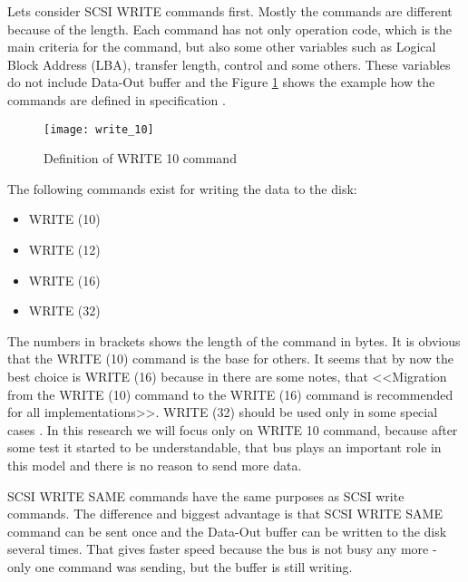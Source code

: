 Lets consider SCSI WRITE commands first. Mostly the commands are different because of the length. Each command has not only operation code, which is the main criteria for the command, but also some other variables such as Logical Block Address (LBA), transfer length, control and some others. These variables do not include Data-Out buffer and the Figure \ref{fig:write_10} shows the example how the commands are defined in specification \cite{scsi3_bc}.
\begin{figure}[h]
\begin{center}
  \texttt{[image: write\_10]}
\end{center}
  \caption{Definition of WRITE 10 command}
  \label{fig:write_10}
\end{figure}

The following commands exist for writing the data to the disk:
\begin{itemize}%
	\setlength{\itemsep}{-2mm}
	\item WRITE (10)
	\item WRITE (12)
	\item WRITE (16)
	\item WRITE (32)
\end{itemize}
The numbers in brackets shows the length of the command in bytes. It is obvious that the WRITE (10) command is the base for others. It seems that by now the best choice is WRITE (16) because in \cite{scsi3_bc} there are some notes, that <<Migration from the WRITE (10) command to the WRITE (16) command is recommended for all implementations>>. WRITE (32) should be used only in some special cases \cite{scsi3_bc}. In this research we will focus only on WRITE 10 command, because after some test it started to be understandable, that bus plays an important role in this model and there is no reason to send more data.

SCSI WRITE SAME commands have the same purposes as SCSI write commands. The difference and biggest advantage is that SCSI WRITE SAME command can be sent once and the Data-Out buffer can be written to the disk several times. That gives faster speed because the bus is not busy any more - only one command was sending, but the buffer is still writing. 

